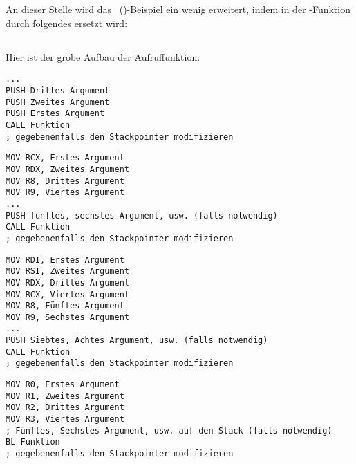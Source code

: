 \section{\PrintfSeveralArgumentsSectionName}

An dieser Stelle wird das \IT{\HelloWorldSectionName}~()-Beispiel ein
wenig erweitert, indem \printf in der \main-Funktion durch folgendes ersetzt wird:







\subsection{\Conclusion{}}

Hier ist der grobe Aufbau der Aufruffunktion:

\begin{lstlisting}[caption=x86,style=customasmx86]
...
PUSH Drittes Argument
PUSH Zweites Argument
PUSH Erstes Argument
CALL Funktion
; gegebenenfalls den Stackpointer modifizieren
\end{lstlisting}

\begin{lstlisting}[caption=x64 (MSVC),style=customasmx86]
MOV RCX, Erstes Argument
MOV RDX, Zweites Argument
MOV R8, Drittes Argument
MOV R9, Viertes Argument
...
PUSH fünftes, sechstes Argument, usw. (falls notwendig)
CALL Funktion
; gegebenenfalls den Stackpointer modifizieren
\end{lstlisting}

\begin{lstlisting}[caption=x64 (GCC),style=customasmx86]
MOV RDI, Erstes Argument
MOV RSI, Zweites Argument
MOV RDX, Drittes Argument
MOV RCX, Viertes Argument
MOV R8, Fünftes Argument
MOV R9, Sechstes Argument
...
PUSH Siebtes, Achtes Argument, usw. (falls notwendig)
CALL Funktion
; gegebenenfalls den Stackpointer modifizieren
\end{lstlisting}

\begin{lstlisting}[caption=ARM,style=customasmARM]
MOV R0, Erstes Argument
MOV R1, Zweites Argument
MOV R2, Drittes Argument
MOV R3, Viertes Argument
; Fünftes, Sechstes Argument, usw. auf den Stack (falls notwendig)
BL Funktion
; gegebenenfalls den Stackpointer modifizieren
\end{lstlisting}

